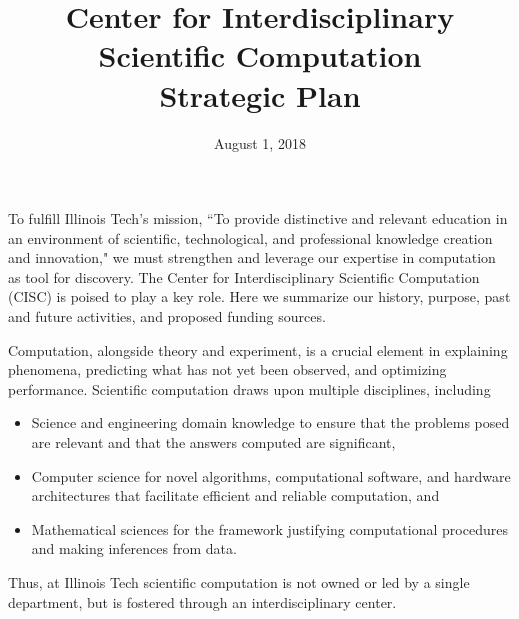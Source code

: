 \documentclass{amsart}
\begin{document}
\title{Center for Interdisciplinary Scientific Computation \\ Strategic Plan}
\date{August 1, 2018}
\maketitle




To fulfill Illinois Tech's mission, ``To provide distinctive and relevant education in an environment of scientific, technological, and professional knowledge creation and innovation," we must strengthen and leverage our expertise in computation as tool for discovery.  The Center for Interdisciplinary Scientific Computation (CISC) is poised to play a key role. Here we summarize our history, purpose, past and future activities, and proposed funding sources.

Computation, alongside theory and experiment, is a crucial element in explaining phenomena, predicting what has not yet been observed, and optimizing performance.  Scientific computation draws upon multiple disciplines, including
\begin{itemize}
    \item Science and engineering domain knowledge to ensure that the problems posed are relevant and that the answers computed are significant,
    \item Computer science for novel algorithms, computational software, and hardware architectures that facilitate efficient and reliable computation, and
    \item Mathematical sciences for the framework justifying computational procedures and making inferences from data.
\end{itemize}
Thus, at Illinois Tech scientific computation is not owned or led by a single department, but is fostered through an interdisciplinary center.
\end{document}
